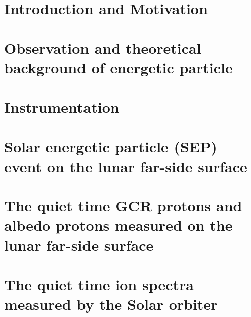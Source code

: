 \documentclass[ twoside,openright,titlepage,numbers=noenddot,headinclude,%
footinclude=true,cleardoublepage=empty,abstractoff, %
BCOR=12mm,paper=a4,fontsize=11pt,%
ngerman,american]{scrreprt} %
\begin{document}
\frenchspacing
\raggedbottom
{} %
\pagestyle{plain}



\cleardoublepage

\cleardoublepage

%
\cleardoublepage



\cleardoublepage
{}
\setcounter{page}{1}


\chapter{Introduction and Motivation} 
\label{chp:introduction}


\chapter{Observation and theoretical background of energetic particle}


\chapter{Instrumentation}
\label{chp:instruments}



\chapter{Solar energetic particle (SEP) event on the lunar far-side surface}
\label{chp:LND_SEP}



\chapter{The quiet time GCR protons and albedo protons measured on the lunar far-side surface}
\label{chp:LND_GCR_albedo}



\chapter{The quiet time ion spectra measured by the Solar orbiter}
\label{chp:SOLO_Quite_time}
\end{document}
